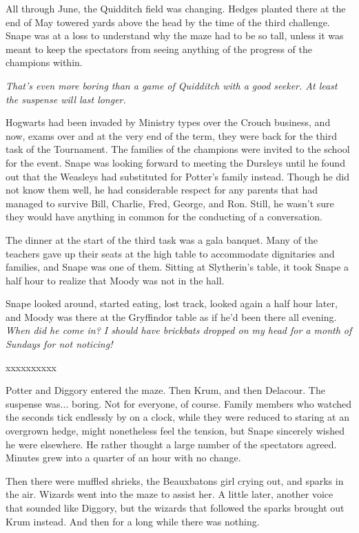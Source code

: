\documentclass[a4paper,11pt]{article}
\begin{document}
All through June, the Quidditch field was changing. Hedges planted there at the end of May towered yards above the head by the time of the third challenge. Snape was at a loss to understand why the maze had to be so tall, unless it was meant to keep the spectators from seeing anything of the progress of the champions within.

\emph{That's even more boring than a game of Quidditch with a good seeker. At least the suspense will last longer.}

Hogwarts had been invaded by Ministry types over the Crouch business, and now, exams over and at the very end of the term, they were back for the third task of the Tournament. The families of the champions were invited to the school for the event. Snape was looking forward to meeting the Dursleys until he found out that the Weasleys had substituted for Potter's family instead. Though he did not know them well, he had considerable respect for any parents that had managed to survive Bill, Charlie, Fred, George, and Ron. Still, he wasn't sure they would have anything in common for the conducting of a conversation.

The dinner at the start of the third task was a gala banquet. Many of the teachers gave up their seats at the high table to accommodate dignitaries and families, and Snape was one of them. Sitting at Slytherin's table, it took Snape a half hour to realize that Moody was not in the hall.

Snape looked around, started eating, lost track, looked again a half hour later, and Moody was there at the Gryffindor table as if he'd been there all evening. \emph{When did he come in? I should have brickbats dropped on my head for a month of Sundays for not noticing!}

xxxxxxxxxx

Potter and Diggory entered the maze. Then Krum, and then Delacour. The suspense was... boring. Not for everyone, of course. Family members who watched the seconds tick endlessly by on a clock, while they were reduced to staring at an overgrown hedge, might nonetheless feel the tension, but Snape sincerely wished he were elsewhere. He rather thought a large number of the spectators agreed. Minutes grew into a quarter of an hour with no change.

Then there were muffled shrieks, the Beauxbatons girl crying out, and sparks in the air. Wizards went into the maze to assist her. A little later, another voice that sounded like Diggory, but the wizards that followed the sparks brought out Krum instead. And then for a long while there was nothing.
\end{document}
